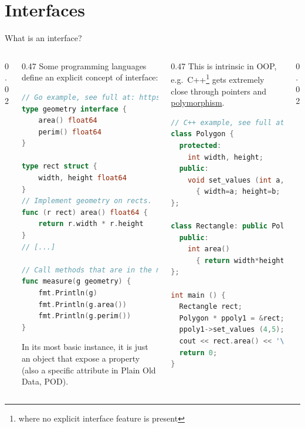 \documentclass[9pt]{beamer}
\begin{document}
\section{Interfaces}

\begin{frame}[fragile]{What is an interface?}
    \vspace*{30pt}
    \begin{columns}
        \begin{column}{0.02\textwidth}
        \end{column}
        \begin{column}{0.47\textwidth}
            Some programming languages define an explicit concept of interface:

            \begin{lstlisting}[language=Go,style=mystyle]
// Go example, see full at: https://gobyexample.com/interfaces
type geometry interface {
    area() float64
    perim() float64
}

type rect struct {
    width, height float64
}
// Implement geometry on rects.
func (r rect) area() float64 {
    return r.width * r.height
}
// [...]

// Call methods that are in the named interface.
func measure(g geometry) {
    fmt.Println(g)
    fmt.Println(g.area())
    fmt.Println(g.perim())
}\end{lstlisting}

            In its most basic instance, it is just an object that expose a
            property (also a specific attribute in Plain Old Data, POD).
        \end{column}
        \begin{column}{0.47\textwidth}
            This is intrinsic in OOP, e.g.\ C++\footnote{
                where no explicit interface feature is present
            } gets extremely close through pointers and
            \href{https://en.wikipedia.org/wiki/Polymorphism_(computer_science)}{polymorphism}.

            \begin{lstlisting}[language=C++,style=mystyle]
// C++ example, see full at: https://cplusplus.com/doc/tutorial/polymorphism/
class Polygon {
  protected:
    int width, height;
  public:
    void set_values (int a, int b)
      { width=a; height=b; }
};

class Rectangle: public Polygon {
  public:
    int area()
      { return width*height; }
};

int main () {
  Rectangle rect;
  Polygon * ppoly1 = &rect;
  ppoly1->set_values (4,5);
  cout << rect.area() << '\n';
  return 0;
}\end{lstlisting}
        \end{column}
        \begin{column}{0.02\textwidth}
        \end{column}
    \end{columns}
\end{frame}
\end{document}
